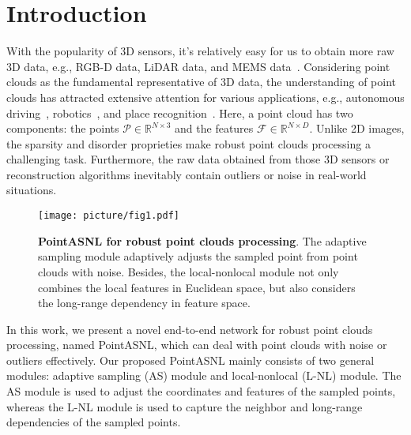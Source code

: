 \documentclass[10pt,twocolumn,letterpaper]{article}
\begin{document}
	\vspace{-0.3cm}
\section{Introduction}
	


	With the popularity of 3D sensors, it's relatively easy for us to obtain more raw 3D data, e.g., RGB-D data, LiDAR data, and MEMS data~\cite{PointConv}. Considering point clouds as the fundamental representative of 3D data, the understanding of point clouds has attracted extensive attention for various applications, e.g., autonomous driving~\cite{shi2019pointrcnn}, robotics~\cite{wang2015voting}, and place recognition~\cite{liu2019lpd}.  Here, a point cloud has two components: the points $\mathcal{P} \in \mathbb{R}^{N\times	3}$ and the features $\mathcal{F} \in \mathbb{R}^{N\times	D}$. Unlike 2D images, the sparsity and disorder proprieties make robust point clouds processing a challenging task. Furthermore, the raw data obtained from those 3D sensors or reconstruction algorithms inevitably contain outliers or noise in real-world situations.
	
	


	\begin{figure}[t]
		\begin{center}
			\texttt{[image: picture/fig1.pdf]}
		\end{center}
		\caption{{\bf PointASNL for robust point clouds processing}. The adaptive sampling module adaptively adjusts the sampled point from point clouds with noise. Besides, the local-nonlocal module not only combines the local features in Euclidean space, but also considers the long-range dependency in feature space.}
		\label{fig:fig1}
		\vspace{-0.5cm}
	\end{figure}
	
	In this work, we present a novel end-to-end network for robust point clouds processing, named PointASNL, which can deal with point clouds with noise or outliers effectively. Our proposed PointASNL mainly consists of two general modules: adaptive sampling (AS) module and local-nonlocal (L-NL) module. The AS module is used to adjust the coordinates and features of the sampled points, whereas the L-NL module is used to capture the neighbor and long-range dependencies of the sampled points.
	
\end{document}
